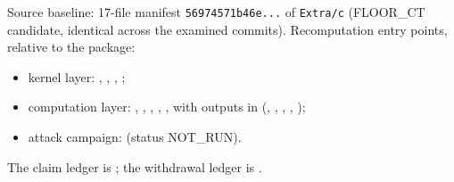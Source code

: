 \documentclass[11pt,a4paper]{article}
\theoremstyle{remark}
\newcommand{\NOTRUN}{\textsf{NOT\_RUN}}
\begin{document}
Source baseline: 17-file manifest \texttt{56974571b46e...} of \texttt{Extra/c}
(FLOOR\_CT candidate, identical across the examined commits). Recomputation
entry points, relative to the package:
\begin{itemize}
\item kernel layer: , ,
  , ;
\item computation layer: ,
  , ,
  , ,
  with outputs in  (,
  , ,
  , );
\item attack campaign:  (status
  \NOTRUN).
\end{itemize}
The claim ledger is ; the withdrawal ledger is
.



\end{document}
